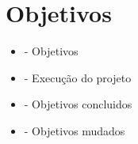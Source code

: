 
\chapter{\label{chap:ativ}Objetivos}


\begin{itemize}
	\item - Objetivos
	\item - Execução do projeto
	\item - Objetivos concluidos
	\item - Objetivos mudados
\end{itemize}